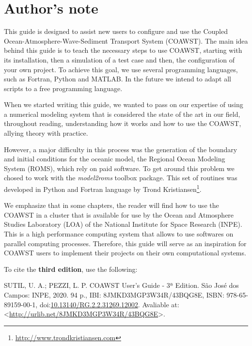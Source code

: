 \chapter*{Author's note}
\bigskip
 This guide is designed to assist new users to configure and use the Coupled Ocean-Atmosphere-Wave-Sediment Transport System (COAWST).
The main idea behind this  guide is to teach the necessary steps to use COAWST, starting with its installation, then a simulation of a test case and 
then, the configuration of your own project. To achieve this goal, we use several programming languages, such as Fortran, Python and MATLAB. In the future we intend to adapt all scripts
to a free programming language.
\bigskip

 When we started writing this guide, we wanted to pass on our expertise of using a numerical modeling system that is considered the state of the art in our field, 
throughout reading, understanding how it works and how to use the COAWST, allying theory with practice.
\bigskip

 However, a major difficulty in this process was the generation of the boundary and initial conditions for the oceanic model, the Regional Ocean Modeling System (ROMS),
which rely on paid software. To get around this problem we chosed to work with the \textit {model2roms} toolbox package. This set of routines was developed in Python and 
Fortran language by Trond Kristiansen\textcolor{bleu_cite}{\textit{}\footnote{\textcolor{bleu_cite}{\href{http://www.trondkristiansen.com}{http://www.trondkristiansen.com}}}}. 
\bigskip

 We emphasize that in some chapters, the reader will find how to use the COAWST in a cluster that is available for use by the Ocean and Atmosphere 
Studies Laboratory (LOA) of the National Institute for Space Research (INPE). This is a high performance computing system that allows to use softwares on 
parallel computing processes. Therefore, this guide will serve as an inspiration for COAWST users to implement their projects on their own computational systems.
\bigskip

 To cite the \textbf{third edition}, use the following:
\bigskip

 SUTIL, U. A.; PEZZI, L. P. COAWST User's Guide - 3ª Edition. São José dos Campos: INPE, 2020. 94 p., IBI: 8JMKD3MGP3W34R/43BQG8E, ISBN: 978-65-89159-00-1, doi:\textcolor{bleu_cite}{\href{https://www.doi.org/10.13140/RG.2.2.31269.12002}{10.13140/RG.2.2.31269.12002}}. Avaliable at: <\textcolor{bleu_cite}{\href{http://urlib.net/8JMKD3MGP3W34R/43BQG8E}{http://urlib.net/8JMKD3MGP3W34R/43BQG8E}}>. 
\bigskip
\newpage

